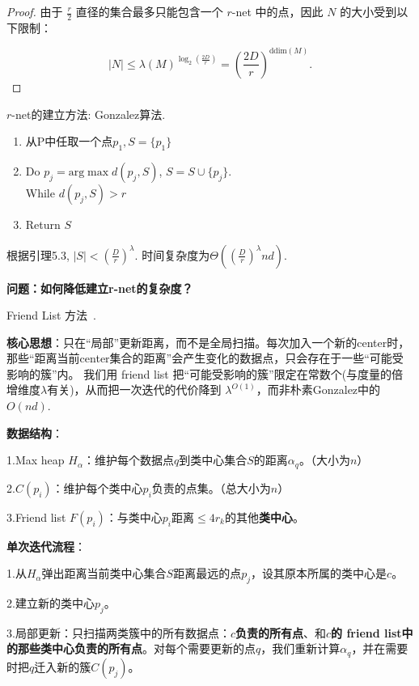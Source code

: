 \documentclass[lang=cn,newtx,10pt,scheme=chinese,chinesefont=nofont,citestyle=gb7714-2015, bibstyle=gb7714-2015]{elegantbook}
\begin{document}
\begin{refsection}
\begin{proof}
由于 $\frac{r}{2}$ 直径的集合最多只能包含一个 $r$-net 中的点，因此 $N$ 的大小受到以下限制：


\[
|N| \leq \lambda(M)^{\log_2(\frac{2D}{r})} = (\frac{2D}{r})^{\text{ddim}(M)}.
\]


       

\end{proof} 

$r$-net的建立方法: Gonzalez算法.
\begin{enumerate}
    \item 从P中任取一个点$p_1,S=\{p_1\}$
    \item Do $p_j=\textrm{arg}\max d(p_j,S)$, $S=S\cup\{p_j\}$.\\
    While $d(p_j,S)>r$
    \item Return $S$
\end{enumerate}
根据引理5.3, $|S|<(\frac{D}{r})^\lambda$. 时间复杂度为$\Theta((\frac{D}{r})^\lambda nd)$.

\quad

\textbf{问题：如何降低建立r-net的复杂度？}

\quad

Friend List 方法~\cite{har2005fast}. %

\quad


\textbf{核心思想}：只在“局部”更新距离，而不是全局扫描。每次加入一个新的center时，那些“距离当前center集合的距离”会产生变化的数据点，只会存在于一些“可能受影响的簇”内。
我们用 friend list 把“可能受影响的簇”限定在常数个(与度量的倍增维度$\lambda$有关)，从而把一次迭代的代价降到 $\lambda^{O(1)}$，而非朴素Gonzalez中的$O(nd)$.

\quad


\textbf{数据结构}：

1.Max heap $H_\alpha$：维护每个数据点$q$到类中心集合$S$的距离$\alpha_q$。（大小为$n$）

2.$C(p_i)$：维护每个类中心$p_i$负责的点集。（总大小为$n$）

3.Friend list $F(p_i)$：与类中心$p_i$距离$\leq 4r_k$的其他\textbf{类中心}。

\quad


\textbf{单次迭代流程}：

1.从$H_\alpha$弹出距离当前类中心集合$S$距离最远的点$p_j$，设其原本所属的类中心是$c$。

2.建立新的类中心$p_j$。

3.局部更新：只扫描两类簇中的所有数据点：\textbf{$c$负责的所有点}、和\textbf{$c$的 friend list中的那些类中心负责的所有点}。对每个需要更新的点$q$，我们重新计算$\alpha_q$，并在需要时把$q$迁入新的簇$C(p_j)$。


\end{refsection}
\end{document}
